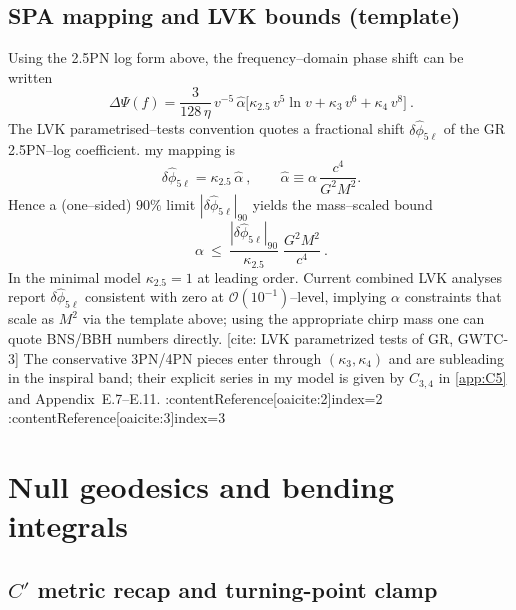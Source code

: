 \documentclass{iopjournal}
\begin{document}
\subsection{SPA mapping and LVK bounds (template)}\label{app:C6}
Using the 2.5PN log form above, the frequency–domain phase shift can be written
\[
\boxed{\ \Delta\Psi(f)=\frac{3}{128\,\eta}\,v^{-5}\,\widehat\alpha\Big[\kappa_{2.5}\,v^{5}\ln v+\kappa_{3}\,v^{6}+\kappa_{4}\,v^{8}\Big]\ } .
\]
The LVK parametrised–tests convention quotes a fractional shift $\delta\hat\phi_{5\ell}$ of the GR 2.5PN–log coefficient. my mapping is
\[
\boxed{\ \delta\hat\phi_{5\ell}=\kappa_{2.5}\,\widehat\alpha\ } ,
\qquad \widehat\alpha\equiv \alpha\,\frac{c^{4}}{G^{2}M^{2}}.
\]
Hence a (one–sided) $90\%$ limit $|\delta\hat\phi_{5\ell}|_{\!90}$ yields the mass–scaled bound
\[
\boxed{\ \alpha\ \le\ \frac{|\delta\hat\phi_{5\ell}|_{\!90}}{\kappa_{2.5}}\;\frac{G^{2}M^{2}}{c^{4}}\ } .
\]
In the minimal model $\kappa_{2.5}=1$ at leading order. Current combined LVK analyses report $\delta\hat\phi_{5\ell}$ consistent with zero at $\mathcal O(10^{-1})$–level, implying $\alpha$ constraints that scale as $M^{2}$ via the template above; using the appropriate chirp mass one can quote BNS/BBH numbers directly. [cite: LVK parametrized tests of GR, GWTC-3]  The conservative 3PN/4PN pieces enter through $(\kappa_{3},\kappa_{4})$ and are subleading in the inspiral band; their explicit series in my model is given by $C_{3,4}$ in \cref{app:C5} and Appendix~E.7–E.11. :contentReference[oaicite:2]{index=2} :contentReference[oaicite:3]{index=3}




\section{Null geodesics and bending integrals}\label{app:D}

\subsection{\texorpdfstring{$C'$ metric recap and turning-point clamp}{C' metric recap and turning-point clamp}}
\label{app:D1}
\end{document}
